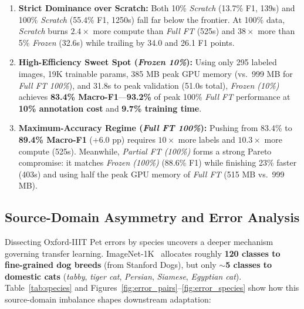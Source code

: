 \documentclass[sigconf,nonacm]{acmart}
\begin{document}
\begin{enumerate}
  \item \textbf{Strict Dominance over Scratch:} Both 10\% \emph{Scratch} (13.7\% F1, 139s) and 100\% \emph{Scratch} (55.4\% F1, 1250s) fall far below the frontier. At 100\% data, \emph{Scratch} burns $2.4\times$ more compute than \emph{Full FT} (525s) and $38\times$ more than 5\% \emph{Frozen} (32.6s) while trailing by 34.0 and 26.1 F1 points.
  \item \textbf{High-Efficiency Sweet Spot (\emph{Frozen 10\%}):} Using only 295 labeled images, 19K trainable params, 385 MB peak GPU memory (vs.\ 999 MB for \emph{Full FT 100\%}), and 31.8s to peak validation (51.0s total), \emph{Frozen (10\%)} achieves \textbf{83.4\% Macro-F1}---\textbf{93.2\%} of peak 100\% \emph{Full FT} performance at \textbf{10\% annotation cost} and \textbf{9.7\% training time}.
  \item \textbf{Maximum-Accuracy Regime (\emph{Full FT 100\%}):} Pushing from 83.4\% to \textbf{89.4\% Macro-F1} (+6.0 pp) requires $10\times$ more labels and $10.3\times$ more compute (525s). Meanwhile, \emph{Partial FT (100\%)} forms a strong Pareto compromise: it matches \emph{Frozen (100\%)} (88.6\% F1) while finishing 23\% faster (403s) and using half the peak GPU memory of \emph{Full FT} (515 MB vs.\ 999 MB).
\end{enumerate}

\subsection{Source-Domain Asymmetry and Error Analysis}
Dissecting Oxford-IIIT Pet errors by species uncovers a deeper mechanism governing transfer learning. ImageNet-1K~\cite{russakovsky2015imagenet} allocates roughly \textbf{120 classes to fine-grained dog breeds} (from Stanford Dogs), but only \textbf{$\sim$5 classes to domestic cats} (\emph{tabby}, \emph{tiger cat}, \emph{Persian}, \emph{Siamese}, \emph{Egyptian cat}). Table~\ref{tab:species} and Figures~\ref{fig:error_pairs}--\ref{fig:error_species} show how this source-domain imbalance shapes downstream adaptation:
\end{document}
